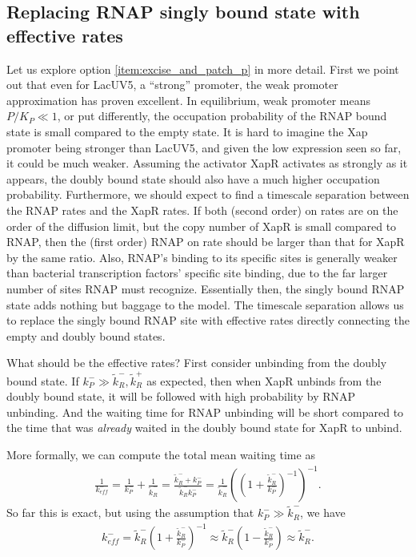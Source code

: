 \documentclass[12pt]{article}%
\newcommand{\rate}[3]{{#1}_{#2}^{#3}}
\begin{document}
\subsection{Replacing RNAP singly bound state with effective rates}
Let us explore option \ref{item:excise_and_patch_p} in more detail.
First we point out that even for LacUV5, a ``strong'' promoter,
the weak promoter approximation has proven excellent.
In equilibrium, weak promoter means $P/K_P \ll 1$, or put differently,
the occupation probability of the RNAP bound state is small compared to the empty state.
It is hard to imagine the Xap promoter being stronger than LacUV5,
and given the low expression seen so far, it could be much weaker.
Assuming the activator XapR activates as strongly as it appears,
the doubly bound state should also have a much higher occupation probability.
Furthermore, we should expect to find a timescale separation
between the RNAP rates and the XapR rates.
If both (second order) on rates are on the order of the diffusion limit,
but the copy number of XapR is small compared to RNAP,
then the (first order) RNAP on rate should be larger than that for XapR by the same ratio.
Also, RNAP's binding to its specific sites is generally weaker than
bacterial transcription factors' specific site binding,
due to the far larger number of sites RNAP must recognize.
Essentially then, the singly bound RNAP state adds nothing but baggage to the model.
The timescale separation allows us to replace the singly bound RNAP site
with effective rates directly connecting the empty and doubly bound states.

What should be the effective rates? 
First consider unbinding from the doubly bound state.
If $\rate{k}{P}{-} \gg \rate{\tilde{k}}{R}{-}, \rate{\tilde{k}}{R}{+}$ as expected,
then when XapR unbinds from the doubly bound state,
it will be followed with high probability by RNAP unbinding.
And the waiting time for RNAP unbinding will be short compared to the time
that was \textit{already} waited in the doubly bound state for XapR to unbind.

More formally, we can compute the total mean waiting time as
\begin{align}
    \frac{1}{\rate{k}{eff}{-}}
    = \frac{1}{\rate{k}{P}{-}} + \frac{1}{\rate{\tilde{k}}{R}{-}}
    = \frac{\rate{\tilde{k}}{R}{-} + \rate{k}{P}{-}}
           {\rate{\tilde{k}}{R}{-}   \rate{k}{P}{-}}
    = \frac{1}{\rate{\tilde{k}}{R}{-}}
        \left(
        \left( 1 + \frac{\rate{\tilde{k}}{R}{-}}{\rate{k}{P}{-}}\right)^{-1}
        \right)^{-1}.
\end{align}
So far this is exact, but using the assumption that
$\rate{k}{P}{-} \gg \rate{\tilde{k}}{R}{-}$, we have
\begin{align}
    \rate{k}{eff}{-}
    = \rate{\tilde{k}}{R}{-}
        \left( 1 + \frac{\rate{\tilde{k}}{R}{-}}{\rate{k}{P}{-}}\right)^{-1}
    \approx \rate{\tilde{k}}{R}{-}
        \left( 1 - \frac{\rate{\tilde{k}}{R}{-}}{\rate{k}{P}{-}}\right)
    \approx \rate{\tilde{k}}{R}{-}.
\end{align}
\end{document}
